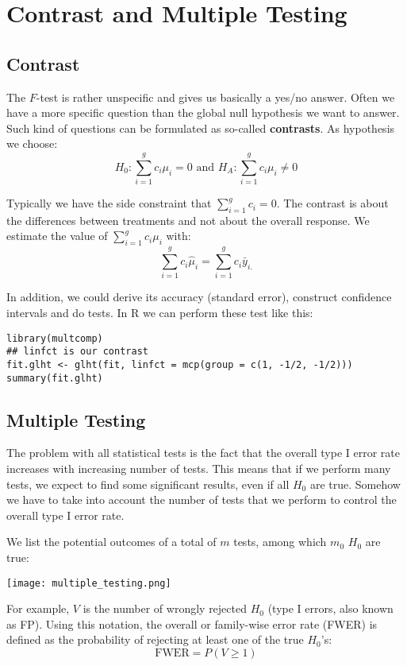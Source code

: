 \section{Contrast and Multiple Testing}

\subsection{Contrast}

The $F$-test is rather unspecific and gives us basically a yes/no answer. Often we have a more specific question than the global null hypothesis we want to answer. Such kind of questions can be formulated as so-called \textbf{contrasts}. As hypothesis we choose:
$$H_0 : \sum_{i=1}^g c_i \mu_i = 0 \text{ and } H_A : \sum_{i=1}^g c_i \mu_i \neq 0$$

Typically we have the side constraint that $\sum_{i=1}^g c_i = 0$. The contrast is about the differences between treatments and not about the overall response. We estimate the value of $\sum_{i=1}^g c_i \mu_i$ with:
$$\sum_{i=1}^g c_i \hat \mu_i = \sum_{i=1}^g c_i \bar y_{i.}$$

In addition, we could derive its accuracy (standard error), construct confidence intervals and do tests. In R we can perform these test like this:

\begin{lstlisting}
library(multcomp)
## linfct is our contrast
fit.glht <- glht(fit, linfct = mcp(group = c(1, -1/2, -1/2)))
summary(fit.glht)
\end{lstlisting}

\subsection{Multiple Testing}

The problem with all statistical tests is the fact that the overall type I error rate increases with increasing number of tests. This means that if we perform many tests, we expect to find some significant results, even if all $H_0$ are true. Somehow we have to take into account the number of tests that we perform to control the overall type I error rate. \medskip

We list the potential outcomes of a total of $m$ tests, among which $m_0$ $H_0$ are true:
\begin{center}
	\texttt{[image: multiple\_testing.png]}
\end{center}

For example, $V$ is the number of wrongly rejected $H_0$ (type I errors, also known as FP). Using this notation, the overall or family-wise error rate (FWER) is defined as the probability of rejecting at least one of the true $H_0$'s:
$$\text{FWER} = P(V \geq 1)$$

